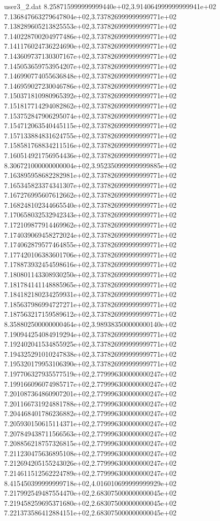 \begin{filecontents}{user3_2.dat}
8.258715999999999440e+02,3.914064999999999941e+02
7.136847663279647804e+02,3.737826999999999771e+02
7.138289605213825553e+02,3.737826999999999771e+02
7.140228700204977486e+02,3.737826999999999771e+02
7.141176024736224690e+02,3.737826999999999771e+02
7.143609737130307167e+02,3.737826999999999771e+02
7.145053659753954207e+02,3.737826999999999771e+02
7.146990774055636848e+02,3.737826999999999771e+02
7.146959027230046786e+02,3.737826999999999771e+02
7.150371810980965392e+02,3.737826999999999771e+02
7.151817714294082862e+02,3.737826999999999771e+02
7.153752847906295074e+02,3.737826999999999771e+02
7.154712063540445115e+02,3.737826999999999771e+02
7.157133884831624755e+02,3.737826999999999771e+02
7.158581768834211516e+02,3.737826999999999771e+02
7.160514921756954436e+02,3.737826999999999771e+02
8.306721000000000004e+02,3.952350999999999885e+02
7.163895958682282981e+02,3.737826999999999771e+02
7.165345823374341307e+02,3.737826999999999771e+02
7.167276995607612662e+02,3.737826999999999771e+02
7.168248102344665540e+02,3.737826999999999771e+02
7.170658032532942343e+02,3.737826999999999771e+02
7.172109877914469962e+02,3.737826999999999771e+02
7.174039069458272024e+02,3.737826999999999771e+02
7.174062879577464855e+02,3.737826999999999771e+02
7.177420106383601706e+02,3.737826999999999771e+02
7.178873932454598616e+02,3.737826999999999771e+02
7.180801143308930250e+02,3.737826999999999771e+02
7.181784141148885965e+02,3.737826999999999771e+02
7.184182180234259931e+02,3.737826999999999771e+02
7.185637986994727271e+02,3.737826999999999771e+02
7.187563217159589612e+02,3.737826999999999771e+02
8.358802500000000464e+02,3.989383500000000140e+02
7.190944254084919294e+02,3.737826999999999771e+02
7.192402041534855925e+02,3.737826999999999771e+02
7.194325291010247838e+02,3.737826999999999771e+02
7.195320179953106390e+02,3.737826999999999771e+02
7.197706327935577519e+02,2.779996300000000247e+02
7.199166096074985717e+02,2.779996300000000247e+02
7.201087364860907201e+02,2.779996300000000247e+02
7.201166731924881788e+02,2.779996300000000247e+02
7.204468401786236882e+02,2.779996300000000247e+02
7.205930150615114371e+02,2.779996300000000247e+02
7.207849438711566563e+02,2.779996300000000247e+02
7.208856218757326815e+02,2.779996300000000247e+02
7.211230475636895108e+02,2.779996300000000247e+02
7.212694205155243026e+02,2.779996300000000247e+02
7.214611512562224789e+02,2.779996300000000247e+02
8.415450399999999718e+02,4.016010699999999929e+02
7.217992549487554470e+02,2.683075000000000045e+02
7.219458259695371680e+02,2.683075000000000045e+02
7.221373586412884151e+02,2.683075000000000045e+02

\end{filecontents}
